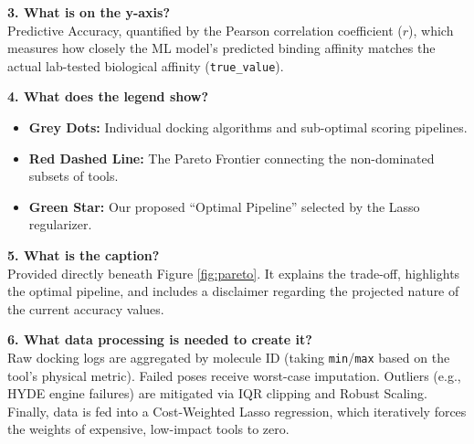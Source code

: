 \documentclass[10pt, a4paper]{article}
\begin{document}
\vspace{0.2cm}
\noindent\textbf{3. What is on the y-axis?}\\
Predictive Accuracy, quantified by the Pearson correlation coefficient ($r$), which measures how closely the ML model's predicted binding affinity matches the actual lab-tested biological affinity (\texttt{true\_value}).

\vspace{0.2cm}
\noindent\textbf{4. What does the legend show?}
\begin{itemize}[noitemsep, topsep=0pt, leftmargin=*]
    \item \textbf{Grey Dots:} Individual docking algorithms and sub-optimal scoring pipelines.
    \item \textbf{Red Dashed Line:} The Pareto Frontier connecting the non-dominated subsets of tools.
    \item \textbf{Green Star:} Our proposed ``Optimal Pipeline'' selected by the Lasso regularizer.
\end{itemize}

\vspace{0.2cm}
\noindent\textbf{5. What is the caption?}\\
Provided directly beneath Figure \ref{fig:pareto}. It explains the trade-off, highlights the optimal pipeline, and includes a disclaimer regarding the projected nature of the current accuracy values.

\vspace{0.2cm}
\noindent\textbf{6. What data processing is needed to create it?}\\
Raw docking logs are aggregated by molecule ID (taking \texttt{min}/\texttt{max} based on the tool's physical metric). Failed poses receive worst-case imputation. Outliers (e.g., HYDE engine failures) are mitigated via IQR clipping and Robust Scaling. Finally, data is fed into a Cost-Weighted Lasso regression, which iteratively forces the weights of expensive, low-impact tools to zero.
\end{document}
